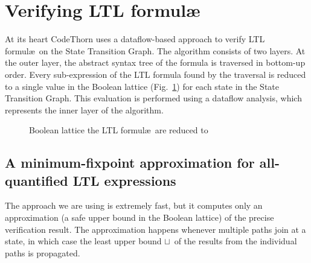 \section{Verifying LTL formul\ae}

\newcommand{\ffalse}{\ensuremath{\mathit{false}}}
\newcommand{\ttrue}{\ensuremath{\mathit{true}}}

At its heart CodeThorn uses a dataflow-based approach to verify LTL
formul\ae\ on the State Transition Graph. The algorithm consists of
two layers. At the outer layer, the abstract syntax tree of the
formula is traversed in bottom-up order. Every sub-expression of the
LTL formula found by the traversal is reduced to a single value in the
Boolean lattice (\cf Fig.~\ref{fig:bool_lattice}) for each state in
the State Transition Graph. This evaluation is performed using a
dataflow analysis, which represents the inner layer of the algorithm.

\begin{figure}
  \centering
  \caption{Boolean lattice the LTL formul\ae\ are reduced to}
  \label{fig:bool_lattice}
\end{figure}

\newcommand{\lub}{\ensuremath{\sqcup}\xspace}
\newcommand{\Lub}{\ensuremath{\bigsqcup}\xspace}
\newcommand{\state}{\ensuremath{\mathit{s}}\xspace}
\newcommand{\STG}{\ensuremath{\mathrm{STG}}\xspace}
\newcommand{\States}{\ensuremath{\mathit{States}}\xspace}
\newcommand{\prop}[1]{\ensuremath{p_{\state,#1}}\xspace} 
\newcommand{\propp}[1]{\ensuremath{p_{\state',#1}}\xspace} 
\newcommand{\G}{\ensuremath{\mathrm{G}}\ }
\newcommand{\F}{\ensuremath{\mathrm{F}}\ }
\newcommand{\X}{\ensuremath{\mathrm{X}}\ }
\newcommand{\R}{\ensuremath{\mathrm{R}}\ }
\newcommand{\U}{\ensuremath{\mathrm{U}}\ }
\newcommand{\WU}{\ensuremath{\mathrm{WU}\ }}

\subsection{A minimum-fixpoint approximation for all-quantified LTL expressions}
The approach we are using is extremely fast, but it computes only an
approximation (a safe upper bound in the Boolean lattice) of the
precise verification result. The approximation happens whenever
multiple paths join at a state, in which case the least upper bound
\lub\ of the results from the individual paths is propagated.

